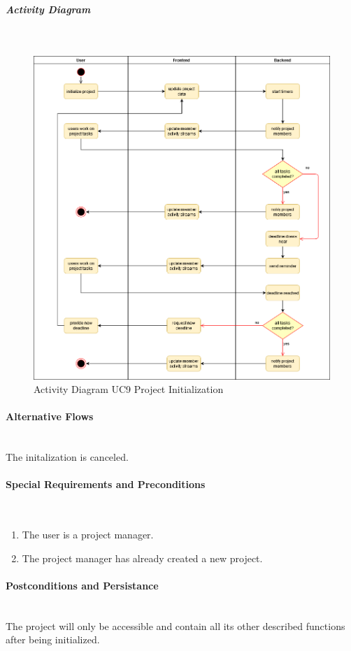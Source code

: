 \subparagraph{Activity Diagram}\mbox{}\\
\begin{figure}[H]
	\centering
	\includegraphics[width=1.0\textwidth]{Content/Domain/UC9Initialization.png}
	\caption{Activity Diagram  \ac{UC}9 Project Initialization}
	\label{fig:label14}
\end{figure}

\paragraph*{Alternative Flows}\mbox{}\\
The initalization is canceled.

\paragraph*{Special Requirements and Preconditions}\mbox{}\\
\begin{enumerate}
	\vspace{-3mm}
	\setlength\itemsep{-1em}
	\item The user is a project manager.
	\item The project manager has already created a new project.
\end{enumerate}

\paragraph*{Postconditions and Persistance}\mbox{}\\
The project will only be accessible and contain all its other described functions after being initialized.


